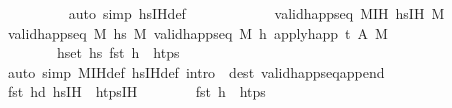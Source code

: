 \begin{isabellebody}
\ \ \ \ \ \ \ \ \isamarkupfalse%
\ {\isacharparenleft}{\kern0pt}auto\ simp{\isacharcolon}{\kern0pt}\ hs{\isacharunderscore}{\kern0pt}IH{\isacharunderscore}{\kern0pt}def{\isacharparenright}{\kern0pt}\isanewline
\ \ \ \ \isamarkupfalse%
\isanewline
\ \ \ \ \isamarkupfalse%
\ \isamarkupfalse%
\ {\isachardoublequoteopen}valid{\isacharunderscore}{\kern0pt}happ{\isacharunderscore}{\kern0pt}seq\ M{\isacharunderscore}{\kern0pt}IH\ hs{\isacharunderscore}{\kern0pt}IH\ M{\isacharprime}{\kern0pt}{\isachardoublequoteclose}\isanewline
\ \ \ \ \ \ \isamarkupfalse%
\ {\isacartoucheopen}valid{\isacharunderscore}{\kern0pt}happ{\isacharunderscore}{\kern0pt}seq\ M\ hs\ M{\isacharprime}{\kern0pt}{\isacartoucheclose}\ {\isacartoucheopen}valid{\isacharunderscore}{\kern0pt}happ{\isacharunderscore}{\kern0pt}seq\ M\ {\isacharbrackleft}{\kern0pt}h{\isacharbrackright}{\kern0pt}\ {\isacharparenleft}{\kern0pt}apply{\isacharunderscore}{\kern0pt}happ\ {\isacharparenleft}{\kern0pt}t{\isacharcomma}{\kern0pt}\ A{\isacharprime}{\kern0pt}{\isacharparenright}{\kern0pt}\ M{\isacharparenright}{\kern0pt}{\isacartoucheclose}\isanewline
\ \ \ \ \ \ \ \ {\isacartoucheopen}{\isacharparenleft}{\kern0pt}{\isasymforall}h{\isasymin}set\ hs{}{\isachardot}{\kern0pt}\ fst\ h\ {\isasymnotin}\ htps{\isacharparenright}{\kern0pt}{\isacartoucheclose}\isanewline
\ \ \ \ \ \ \isamarkupfalse%
\ {\isacharparenleft}{\kern0pt}auto\ simp{\isacharcolon}{\kern0pt}\ M{\isacharunderscore}{\kern0pt}IH{\isacharunderscore}{\kern0pt}def\ hs{\isacharunderscore}{\kern0pt}IH{\isacharunderscore}{\kern0pt}def\ intro{\isacharcolon}{\kern0pt}\ {}{\isacharparenleft}{\kern0pt}{}{\isacharparenright}{\kern0pt}\ dest{\isacharbang}{\kern0pt}{\isacharcolon}{\kern0pt}\ valid{\isacharunderscore}{\kern0pt}happ{\isacharunderscore}{\kern0pt}seq{\isacharunderscore}{\kern0pt}append{\isacharunderscore}{\kern0pt}{}{\isacharparenright}{\kern0pt}\isanewline
\ \ \ \ \isamarkupfalse%
\ \isamarkupfalse%
\ {\isachardoublequoteopen}{\isacharparenleft}{\kern0pt}fst\ {\isacharparenleft}{\kern0pt}hd\ hs{\isacharunderscore}{\kern0pt}IH{\isacharparenright}{\kern0pt}{\isacharparenright}{\kern0pt}\ {\isasymin}\ htps{\isacharunderscore}{\kern0pt}IH{\isachardoublequoteclose}\isanewline
\ \ \ \ \ \ \isamarkupfalse%
\ {\isacartoucheopen}fst\ h{}\ {\isasymin}\ htps{\isacartoucheclose}\isanewline
\ \ \ \ \ \ \isamarkupfalse%

\end{isabellebody}
